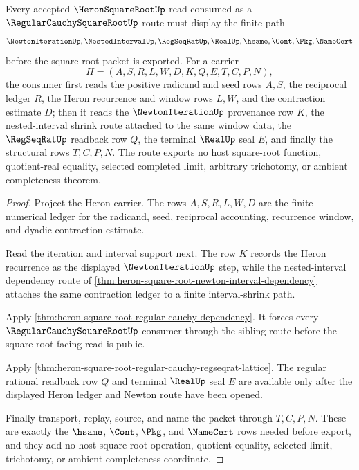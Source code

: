\begin{theorem}
\label{thm:heron-square-root-regular-cauchy-square-root-forward-route}
Every accepted $\HeronSquareRootUp$ read consumed as a $\RegularCauchySquareRootUp$ route must display the finite path
$$
\NewtonIterationUp,\NestedIntervalUp,\RegSeqRatUp,\RealUp,\hsame,\Cont,\Pkg,\NameCert
$$
before the square-root packet is exported. For a carrier
$$
H=(A,S,R,L,W,D,K,Q,E,T,C,P,N),
$$
the consumer first reads the positive radicand and seed rows $A,S$, the reciprocal ledger $R$, the Heron recurrence and window rows $L,W$, and the contraction estimate $D$; then it reads the $\NewtonIterationUp$ provenance row $K$, the nested-interval shrink route attached to the same window data, the $\RegSeqRatUp$ readback row $Q$, the terminal $\RealUp$ seal $E$, and finally the structural rows $T,C,P,N$. The route exports no host square-root function, quotient-real equality, selected completed limit, arbitrary trichotomy, or ambient completeness theorem.
\end{theorem}
\begin{proof}
Project the Heron carrier. The rows $A,S,R,L,W,D$ are the finite numerical ledger for the radicand, seed, reciprocal accounting, recurrence window, and dyadic contraction estimate.

Read the iteration and interval support next. The row $K$ records the Heron recurrence as the displayed $\NewtonIterationUp$ step, while the nested-interval dependency route of \autoref{thm:heron-square-root-newton-interval-dependency} attaches the same contraction ledger to a finite interval-shrink path.

Apply \autoref{thm:heron-square-root-regular-cauchy-dependency}. It forces every $\RegularCauchySquareRootUp$ consumer through the sibling route before the square-root-facing read is public.

Apply \autoref{thm:heron-square-root-regular-cauchy-regseqrat-lattice}. The regular rational readback row $Q$ and terminal $\RealUp$ seal $E$ are available only after the displayed Heron ledger and Newton route have been opened.

Finally transport, replay, source, and name the packet through $T,C,P,N$. These are exactly the $\hsame$, $\Cont$, $\Pkg$, and $\NameCert$ rows needed before export, and they add no host square-root operation, quotient equality, selected limit, trichotomy, or ambient completeness coordinate.
\end{proof}
